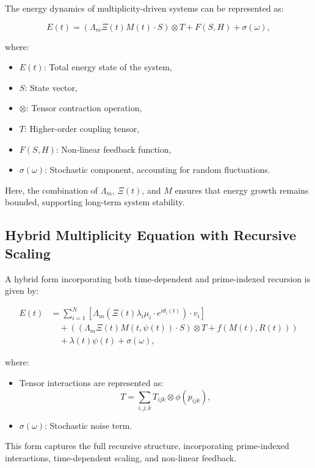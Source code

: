 \documentclass{article}
\theoremstyle{plain}
\begin{document}
The energy dynamics of multiplicity-driven systems can be represented as:

\begin{equation}
E(t) = (\Lambda_m \Xi(t) M(t) \cdot S) \otimes T + F(S, H) + \sigma(\omega),
\end{equation}

where:
\begin{itemize}
    \item \( E(t) \): Total energy state of the system,
    \item \( S \): State vector,
    \item \( \otimes \): Tensor contraction operation,
    \item \( T \): Higher-order coupling tensor,
    \item \( F(S, H) \): Non-linear feedback function,
    \item \( \sigma(\omega) \): Stochastic component, accounting for random fluctuations.
\end{itemize}

Here, the combination of \(\Lambda_m\), \(\Xi(t)\), and \(M\) ensures that energy growth remains bounded, supporting long-term system stability.

\subsection{Hybrid Multiplicity Equation with Recursive Scaling}

A hybrid form incorporating both time-dependent and prime-indexed recursion is given by:

\begin{align}
E(t) &= \sum_{i=1}^N \left[ \Lambda_m \left( \Xi(t) \lambda_i \mu_i \cdot e^{i\theta_i(t)} \right) \cdot v_i \right] \nonumber \\
&\quad + \left( (\Lambda_m \Xi(t) M(t, \psi(t)) \cdot S) \otimes T + f(M(t), R(t)) \right) \nonumber \\
&\quad + \lambda(t)\psi(t) + \sigma(\omega),
\end{align}

where:
\begin{itemize}
    \item Tensor interactions are represented as:
    \[
    T = \sum_{i,j,k} T_{ijk} \otimes \phi(p_{ijk}),
    \]
    \item \( \sigma(\omega) \): Stochastic noise term.
\end{itemize}

This form captures the full recursive structure, incorporating prime-indexed interactions, time-dependent scaling, and non-linear feedback.
\end{document}
